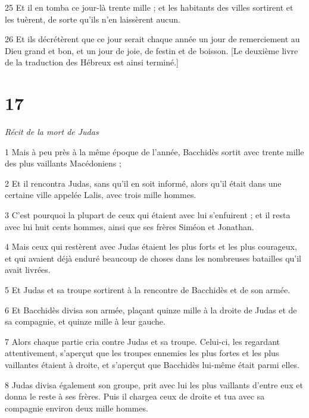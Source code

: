 \par 25 Et il en tomba ce jour-là trente mille ; et les habitants des villes sortirent et les tuèrent, de sorte qu'ils n'en laissèrent aucun.

\par 26 Et ils décrétèrent que ce jour serait chaque année un jour de remerciement au Dieu grand et bon, et un jour de joie, de festin et de boisson. [Le deuxième livre de la traduction des Hébreux est ainsi terminé.]

\chapter{17}

\par \textit{Récit de la mort de Judas}

\par 1 Mais à peu près à la même époque de l'année, Bacchidès sortit avec trente mille des plus vaillants Macédoniens ;

\par 2 Et il rencontra Judas, sans qu'il en soit informé, alors qu'il était dans une certaine ville appelée Lalis, avec trois mille hommes.

\par 3 C'est pourquoi la plupart de ceux qui étaient avec lui s'enfuirent ; et il resta avec lui huit cents hommes, ainsi que ses frères Siméon et Jonathan.

\par 4 Mais ceux qui restèrent avec Judas étaient les plus forts et les plus courageux, et qui avaient déjà enduré beaucoup de choses dans les nombreuses batailles qu'il avait livrées.

\par 5 Et Judas et sa troupe sortirent à la rencontre de Bacchidès et de son armée.

\par 6 Et Bacchidès divisa son armée, plaçant quinze mille à la droite de Judas et de sa compagnie, et quinze mille à leur gauche.

\par 7 Alors chaque partie cria contre Judas et sa troupe. Celui-ci, les regardant attentivement, s'aperçut que les troupes ennemies les plus fortes et les plus vaillantes étaient à droite, et s'aperçut que Bacchidès lui-même était parmi elles.

\par 8 Judas divisa également son groupe, prit avec lui les plus vaillants d'entre eux et donna le reste à ses frères. Puis il chargea ceux de droite et tua avec sa compagnie environ deux mille hommes.

